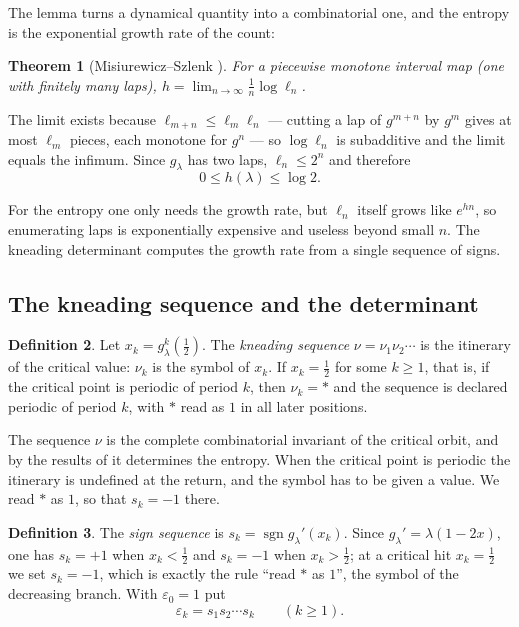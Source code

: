\documentclass[11pt]{article}
\theoremstyle{plain}
\newtheorem{theorem}{Theorem}[section]
\theoremstyle{definition}
\newtheorem{definition}[theorem]{Definition}
\newcommand{\eps}{\varepsilon}
\newcommand{\sgn}{\operatorname{sgn}}
\begin{document}
The lemma turns a dynamical quantity into a combinatorial one, and the entropy is the
exponential growth rate of the count:

\begin{theorem}[Misiurewicz--Szlenk \cite{MS}]\label{thm:MS}
For a piecewise monotone interval map (one with finitely many laps),
$\displaystyle h=\lim_{n\to\infty}\frac1n\log\ell_n$.
\end{theorem}

The limit exists because $\ell_{m+n}\le\ell_m\ell_n$ --- cutting a lap of $g^{m+n}$ by
$g^m$ gives at most $\ell_m$ pieces, each monotone for $g^n$ --- so $\log\ell_n$ is
subadditive and the limit equals the infimum.  Since $g_\lambda$ has two laps, $\ell_n\le2^n$
and therefore
\begin{equation}\label{eq:bound}
  0\le h(\lambda)\le\log2 .
\end{equation}

For the entropy one only needs the growth rate, but $\ell_n$ itself grows like $e^{hn}$, so
enumerating laps is exponentially expensive and useless beyond small $n$.  The kneading
determinant computes the growth rate from a single sequence of signs.

\subsection{The kneading sequence and the determinant}

\begin{definition}\label{def:kneading}
Let $x_k=g_\lambda^k(\tfrac12)$.  The \emph{kneading sequence} $\nu=\nu_1\nu_2\cdots$ is
the itinerary of the critical value: $\nu_k$ is the symbol of $x_k$.  If $x_k=\tfrac12$ for
some $k\ge1$, that is, if the critical point is periodic of period $k$, then $\nu_k=*$ and
the sequence is declared periodic of period $k$, with $*$ read as $1$ in all later
positions.
\end{definition}

The sequence $\nu$ is the complete combinatorial invariant of the critical orbit, and by
the results of \cite{MT} it determines the entropy.  When the critical point is periodic
the itinerary is undefined at the return, and the symbol has to be given a value.  We read
$*$ as $1$, so that $s_k=-1$ there.

\begin{definition}\label{def:eps}
The \emph{sign sequence} is $s_k=\sgn g_\lambda'(x_k)$.  Since
$g_\lambda'=\lambda(1-2x)$, one has $s_k=+1$ when $x_k<\tfrac12$ and $s_k=-1$ when
$x_k>\tfrac12$; at a critical hit $x_k=\tfrac12$ we set $s_k=-1$, which is exactly the
rule ``read $*$ as $1$'', the symbol of the decreasing branch.  With $\eps_0=1$ put
\begin{equation}\label{eq:eps}
  \eps_k=s_1s_2\cdots s_k\qquad(k\ge1).
\end{equation}
\end{definition}
\end{document}
